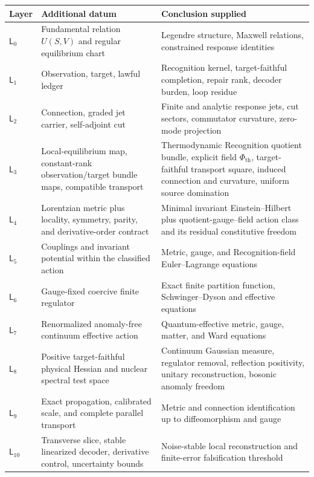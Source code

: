 \begin{center}
\begin{tabular}{p{}p{}p{}}
\toprule
Layer & Additional datum & Conclusion supplied\\
\midrule
$\mathsf L_0$ & Fundamental relation $U(S,V)$ and regular equilibrium chart & Legendre structure, Maxwell relations, constrained response identities\\
$\mathsf L_1$ & Observation, target, lawful ledger & Recognition kernel, target-faithful completion, repair rank, decoder burden, loop residue\\
$\mathsf L_2$ & Connection, graded jet carrier, self-adjoint cut & Finite and analytic response jets, cut sectors, commutator curvature, zero-mode projection\\
$\mathsf L_3$ & Local-equilibrium map, constant-rank observation/target bundle maps, compatible transport & Thermodynamic Recognition quotient bundle, explicit field $\Phi_{\mathrm{th}}$, target-faithful transport square, induced connection and curvature, uniform source domination\\
$\mathsf L_4$ & Lorentzian metric plus locality, symmetry, parity, and derivative-order contract & Minimal invariant Einstein--Hilbert plus quotient-gauge--field action class and its residual constitutive freedom\\
$\mathsf L_5$ & Couplings and invariant potential within the classified action & Metric, gauge, and Recognition-field Euler--Lagrange equations\\
$\mathsf L_6$ & Gauge-fixed coercive finite regulator & Exact finite partition function, Schwinger--Dyson and effective equations\\
$\mathsf L_7$ & Renormalized anomaly-free continuum effective action & Quantum-effective metric, gauge, matter, and Ward equations\\
$\mathsf L_8$ & Positive target-faithful physical Hessian and nuclear spectral test space & Continuum Gaussian measure, regulator removal, reflection positivity, unitary reconstruction, bosonic anomaly freedom\\
$\mathsf L_9$ & Exact propagation, calibrated scale, and complete parallel transport & Metric and connection identification up to diffeomorphism and gauge\\
$\mathsf L_{10}$ & Transverse slice, stable linearized decoder, derivative control, uncertainty bounds & Noise-stable local reconstruction and finite-error falsification threshold\\
\bottomrule
\end{tabular}
\end{center}

